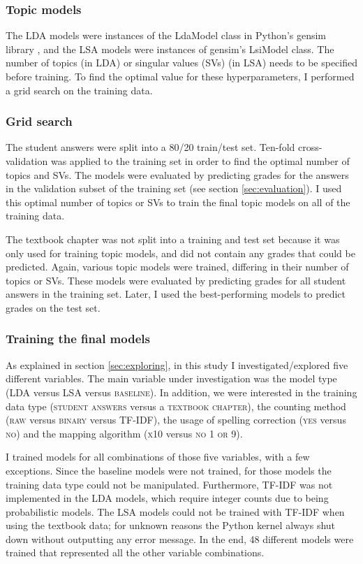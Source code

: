 \documentclass[a4paper,10pt,twoside]{article}
\begin{document}
\subsubsection{Topic models}
The LDA models were instances of the LdaModel class in Python's gensim library \cite{rehurek2010}, and the LSA models were instances of gensim's LsiModel class. The number of topics (in LDA) or singular values (SVs) (in LSA) needs to be specified before training. To find the optimal value for these hyperparameters, I performed a grid search on the training data.

\subsubsection{Grid search}
\label{sec:gridsearch}
The student answers were split into a 80/20 train/test set. Ten-fold cross-validation was applied to the training set in order to find the optimal number of topics and SVs. The models were evaluated by predicting grades for the answers in the validation subset of the training set (see section \ref{sec:evaluation}). I used this optimal number of topics or SVs to train the final topic models on all of the training data.

The textbook chapter was not split into a training and test set because it was only used for training topic models, and did not contain any grades that could be predicted. Again, various topic models were trained, differing in their number of topics or SVs. These models were evaluated by predicting grades for all student answers in the training set. Later, I used the best-performing models to predict grades on the test set.

\subsubsection{Training the final models}
\label{sec:training}
As explained in section \ref{sec:exploring}, in this study I investigated/explored five different variables. The main variable under investigation was the model type (LDA versus LSA versus \textsc{baseline}). In addition, we were interested in the training data type (\textsc{student answers} versus a \textsc{textbook chapter}), the counting method (\textsc{raw} versus \textsc{binary} versus TF-IDF), the usage of spelling correction (\textsc{yes} versus \textsc{no}) and the mapping algorithm (\textsc{x10} versus \textsc{no 1 or 9}).

I trained models for all combinations of those five variables, with a few exceptions. Since the baseline models were not trained, for those models the training data type could not be manipulated. Furthermore, TF-IDF was not implemented in the LDA models, which require integer counts due to being probabilistic models. The LSA models could not be trained with TF-IDF when using the textbook data; for unknown reasons the Python kernel always shut down without outputting any error message. In the end, 48 different models were trained that represented all the other variable combinations.
\end{document}
